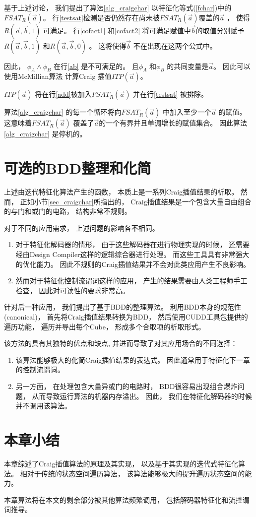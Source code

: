 基于上述讨论，
我们提出了算法\ref{alg_craigchar} 以特征化等式(\ref{fchar})中的$FSAT_R(\vec{a})$。
行\ref{testsat}检测是否仍然存在尚未被$FSAT_R(\vec{a})$覆盖的$\vec{a}$ ，
使得$R(\vec{a},\vec{b},1)$ 可满足。
行\ref{cofact1} 和\ref{cofact2} 将可满足赋值中$\vec{b}$的取值分别赋予
$R(\vec{a},\vec{b},1)$ 和$R(\vec{a},\vec{b},0)$ 。
这将使得$\vec{b}$ 不在出现在这两个公式中。

因此，
$\phi_A\wedge \phi_B$ 在行\ref{ab} 是不可满足的。
且$\phi_A$ 和$\phi_B$ 的共同变量是$\vec{a}$。
因此可以使用McMillian算法 计算Craig 插值$ITP(\vec{a})$。

$ITP(\vec{a})$ 将在行\ref{add}被加入$FSAT_R(\vec{a})$  并在行\ref{testsat} 被排除。

算法\ref{alg_craigchar} 的每一个循环将向$FSAT_R(\vec{a})$ 中加入至少一个$\vec{a}$ 的赋值。
这意味着$FSAT_R(\vec{a})$ 覆盖了$\vec{a}$的一个有界并且单调增长的赋值集合。
因此算法\ref{alg_craigchar} 是停机的。

\section{可选的BDD整理和化简}

上述由迭代特征化算法产生的函数，
本质上是一系列Craig插值结果的析取。
然而，
正如小节\ref{sec_craigchar}所指出的，
Craig插值结果是一个包含大量自由组合的与门和或门的电路，
结构非常不规则。

对于不同的应用需求，
上述问题的影响各不相同。
\begin{enumerate}
\item 对于特征化解码器的情形，
由于这些解码器在进行物理实现的时候，
还需要经由Design Compiler这样的逻辑综合器进行处理。
而这些工具具有非常强大的优化能力。
因此不规则的Craig插值结果并不会对此类应用产生不良影响。
\item 然而对于特征化控制流谓词这样的应用，
产生的结果需要由人类工程师手工检查，
因此对可读性的要求非常高。
\end{enumerate}

针对后一种应用，
我们提出了基于BDD的整理算法。
利用BDD本身的规范性(canonical)，
首先将Craig插值结果转换为BDD，
然后使用CUDD工具包提供的遍历功能，
遍历并导出每个Cube，
形成多个合取项的析取形式。

该方法的具有其独特的优点和缺点,
并进而导致了对其应用场合的不同选择：

\begin{enumerate}
\item 该算法能够极大的化简Craig插值结果的表达式。
因此通常用于特征化下一章的控制流谓词。

\item 另一方面，
在处理包含大量异或门的电路时，
BDD很容易出现组合爆炸问题，
从而导致运行算法的机器内存溢出。
因此，
我们在特征化解码器的时候并不调用该算法。
\end{enumerate}

\section{本章小结}
本章综述了Craig插值算法的原理及其实现，
以及基于其实现的迭代式特征化算法。
相对于传统的状态空间遍历算法，
该算法能够极大的提升遍历状态空间的能力。

本章算法将在本文的剩余部分被其他算法频繁调用，
包括解码器特征化和流控谓词推导。
